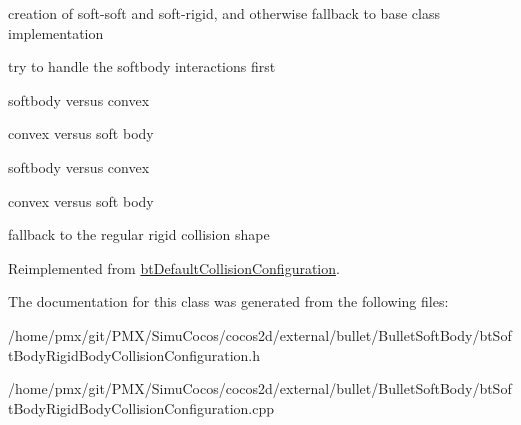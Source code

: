 creation of soft-\/soft and soft-\/rigid, and otherwise fallback to base class implementation 

try to handle the softbody interactions first

softbody versus convex

convex versus soft body

softbody versus convex

convex versus soft body

fallback to the regular rigid collision shape 

Reimplemented from \hyperlink{classbtDefaultCollisionConfiguration}{bt\+Default\+Collision\+Configuration}.



The documentation for this class was generated from the following files\+:\begin{DoxyCompactItemize}
\item 
/home/pmx/git/\+P\+M\+X/\+Simu\+Cocos/cocos2d/external/bullet/\+Bullet\+Soft\+Body/bt\+Soft\+Body\+Rigid\+Body\+Collision\+Configuration.\+h\item 
/home/pmx/git/\+P\+M\+X/\+Simu\+Cocos/cocos2d/external/bullet/\+Bullet\+Soft\+Body/bt\+Soft\+Body\+Rigid\+Body\+Collision\+Configuration.\+cpp\end{DoxyCompactItemize}

